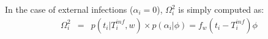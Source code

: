 \documentclass[10pt]{article}
\begin{document}
In the case of external infections ($\alpha_i=0$), $\Omega_i^2$ is simply computed as:
\begin{eqnarray}
\Omega_i^2 & = & p(t_i | T_i^{inf}, w) \times p(\alpha_i | \phi) = f_w(t_i - T_i^{inf}) \phi
\end{eqnarray}
\\

% 
~\\
\end{document}
